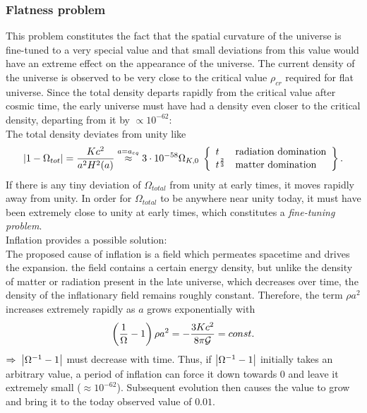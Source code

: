 \subsubsection{Flatness problem}
This problem constitutes the fact that the spatial curvature of the universe is fine-tuned to a very special value and that small deviations from this value would have an extreme effect on the appearance of the universe.  The current density of the universe is observed to be very close to the critical value $\rho_{cr}$ required for flat universe. Since the total density departs rapidly from the critical value after cosmic time, the early universe must have had a density even closer to the critical density, departing from it by $\propto 10^{-62}$:
\\
The total density deviates from unity like
\begin{equation}
	\abs{1-\Omega_{tot}} = \frac{K c^2}{a^2 H^2(a)} \stackrel{a=a_{eq}}{\approx} 3\cdot 10^{-58} \Omega_{K,0} \; \left\{\begin{array}{ll}
	t & \text{radiation domination} \\
	t^{\frac{2}{3}} & \text{matter domination} \\
	\end{array}		\right\}.
\end{equation}
If there is any tiny deviation of $\Omega_{total}$ from unity at early times, it moves rapidly away from unity. In order for $\Omega_{total}$ to be anywhere near unity today, it must have been extremely close to unity at early times, which constitutes a \emph{fine-tuning problem}.
\\
Inflation provides a possible solution:\\
The proposed cause of inflation is a field which permeates spacetime and drives the expansion. the field contains a certain energy density, but unlike the density of matter or radiation present in the late universe, which decreases over time, the density of the inflationary field remains roughly constant. Therefore, the term $\rho a^2$ increases extremely rapidly as $a$ grows exponentially with
\begin{equation}
\left( \frac{1}{\Omega}-1  \right)\rho a^2 = -\frac{3 K c^2}{8 \pi \mathcal{G}} = const. 
\end{equation}
$\Rightarrow \; \abs{\Omega^{-1}-1}$ must decrease with time. Thus, if $\abs{\Omega^{-1}-1}$ initially takes an arbitrary value, a period of inflation can force it down towards $0$ and leave it extremely small ($\approx 10^{-62}$). Subsequent evolution then causes the value to grow and bring it to the today observed value of $0.01$.

